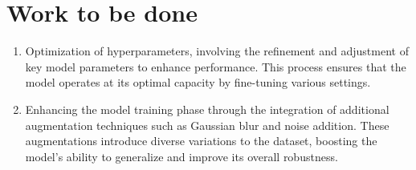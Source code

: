\chapter{Work to be done}
\begin{enumerate}
  \item Optimization of hyperparameters, involving the refinement and adjustment of key model parameters to enhance performance. This process ensures that the model operates at its optimal capacity by fine-tuning various settings.
  \item Enhancing the model training phase through the integration of additional augmentation techniques such as Gaussian blur and noise addition. These augmentations introduce diverse variations to the dataset, boosting the model's ability to generalize and improve its overall robustness. 
\end{enumerate}